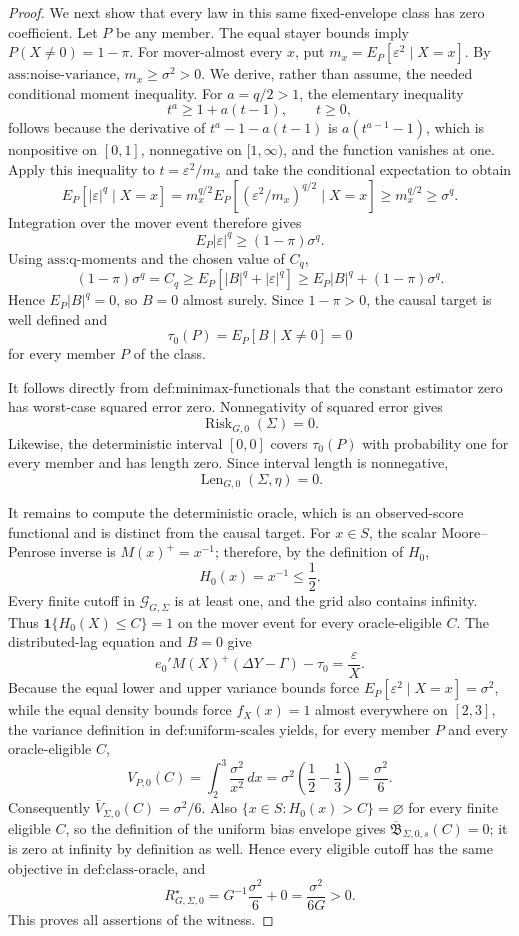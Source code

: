 \documentclass{article}
\begin{document}
\begin{proof}
We next show that every law in this same fixed-envelope class has zero coefficient. Let \(P\) be any member. The equal stayer bounds imply \(P(X\ne0)=1-\pi\). For mover-almost every \(x\), put \(m_x=E_P[\varepsilon^2\mid X=x]\). By \(\text{ass:noise-variance}\), \(m_x\ge\sigma^2>0\). We derive, rather than assume, the needed conditional moment inequality. For \(a=q/2>1\), the elementary inequality
\[
 t^a\ge 1+a(t-1),\qquad t\ge0,
\]
follows because the derivative of \(t^a-1-a(t-1)\) is \(a(t^{a-1}-1)\), which is nonpositive on \([0,1]\), nonnegative on \([1,\infty)\), and the function vanishes at one. Apply this inequality to \(t=\varepsilon^2/m_x\) and take the conditional expectation to obtain
\[
 E_P[|\varepsilon|^q\mid X=x]
 =m_x^{q/2}E_P[(\varepsilon^2/m_x)^{q/2}\mid X=x]
 \ge m_x^{q/2}
 \ge\sigma^q.
\]
Integration over the mover event therefore gives
\[
 E_P|\varepsilon|^q\ge(1-\pi)\sigma^q.
\]
Using \(\text{ass:q-moments}\) and the chosen value of \(C_q\),
\[
 (1-\pi)\sigma^q=C_q
 \ge E_P[|B|^q+|\varepsilon|^q]
 \ge E_P|B|^q+(1-\pi)\sigma^q.
\]
Hence \(E_P|B|^q=0\), so \(B=0\) almost surely. Since \(1-\pi>0\), the causal target is well defined and
\[
 \tau_0(P)=E_P[B\mid X\ne0]=0
\]
for every member \(P\) of the class.

It follows directly from \(\text{def:minimax-functionals}\) that the constant estimator zero has worst-case squared error zero. Nonnegativity of squared error gives
\[
 \operatorname{Risk}_{G,0}(\Sigma)=0.
\]
Likewise, the deterministic interval \([0,0]\) covers \(\tau_0(P)\) with probability one for every member and has length zero. Since interval length is nonnegative,
\[
 \operatorname{Len}_{G,0}(\Sigma,\eta)=0.
\]

It remains to compute the deterministic oracle, which is an observed-score functional and is distinct from the causal target. For \(x\in S\), the scalar Moore--Penrose inverse is \(M(x)^+=x^{-1}\); therefore, by the definition of \(H_0\),
\[
 H_0(x)=x^{-1}\le\frac12.
\]
Every finite cutoff in \(\mathcal G_{G,\Sigma}\) is at least one, and the grid also contains infinity. Thus \(\mathbf 1\{H_0(X)\le C\}=1\) on the mover event for every oracle-eligible \(C\). The distributed-lag equation and \(B=0\) give
\[
 e_0'M(X)^+(\Delta Y-\Gamma)-\tau_0
 =\frac{\varepsilon}{X}.
\]
Because the equal lower and upper variance bounds force \(E_P[\varepsilon^2\mid X=x]=\sigma^2\), while the equal density bounds force \(f_X(x)=1\) almost everywhere on \([2,3]\), the variance definition in \(\text{def:uniform-scales}\) yields, for every member \(P\) and every oracle-eligible \(C\),
\[
 V_{P,0}(C)
 =\int_2^3\frac{\sigma^2}{x^2}\,dx
 =\sigma^2\left(\frac12-\frac13\right)
 =\frac{\sigma^2}{6}.
\]
Consequently \(\overline V_{\Sigma,0}(C)=\sigma^2/6\). Also \(\{x\in S:H_0(x)>C\}=\varnothing\) for every finite eligible \(C\), so the definition of the uniform bias envelope gives \(\overline{\mathfrak B}_{\Sigma,0,s}(C)=0\); it is zero at infinity by definition as well. Hence every eligible cutoff has the same objective in \(\text{def:class-oracle}\), and
\[
 R_{G,\Sigma,0}^{\star}
 =G^{-1}\frac{\sigma^2}{6}+0
 =\frac{\sigma^2}{6G}>0.
\]
This proves all assertions of the witness.
\end{proof}
\end{document}

